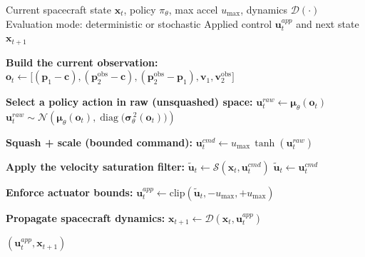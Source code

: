 \begin{algorithm}[H]
\caption{Policy Interface + Spacecraft Actuation: Policy Action $\rightarrow$ Applied Acceleration}
\label{alg:actuation_interface}
\begin{algorithmic}[1]
\Require Current spacecraft state $\mathbf{x}_t$, policy $\pi_\theta$, max accel $u_{\max}$, dynamics $\mathcal{D}(\cdot)$
\Require Evaluation mode: deterministic or stochastic
\Ensure Applied control $\mathbf{u}_t^{app}$ and next state $\mathbf{x}_{t+1}$

\State \textbf{Build the current observation:}
\State \hspace{1em} $\mathbf{o}_t \leftarrow \big[(\mathbf{p}_1-\mathbf{c}),(\mathbf{p}_2^{\mathrm{obs}}-\mathbf{c}),(\mathbf{p}_2^{\mathrm{obs}}-\mathbf{p}_1),\mathbf{v}_1,\mathbf{v}_2^{\mathrm{obs}}\big]$

\State \textbf{Select a policy action in raw (unsquashed) space:}
    \State \hspace{1em} $\mathbf{u}_t^{raw} \leftarrow \boldsymbol{\mu}_\theta(\mathbf{o}_t)$
\Else
    \State \hspace{1em} $\mathbf{u}_t^{raw} \sim \mathcal{N}\!\left(\boldsymbol{\mu}_\theta(\mathbf{o}_t), \operatorname{diag}\!\big(\boldsymbol{\sigma}_\theta^{\,2}(\mathbf{o}_t)\big)\right)$
\EndIf

\State \textbf{Squash + scale (bounded command):}
\State \hspace{1em} $\mathbf{u}_t^{cmd} \leftarrow u_{\max}\,\tanh\!\left(\mathbf{u}_t^{raw}\right)$

\State \textbf{Apply the velocity saturation filter:}
    \State \hspace{1em} $\tilde{\mathbf{u}}_t \leftarrow \mathcal{S}\!\left(\mathbf{x}_t,\mathbf{u}_t^{cmd}\right)$
\Else
    \State \hspace{1em} $\tilde{\mathbf{u}}_t \leftarrow \mathbf{u}_t^{cmd}$
\EndIf

\State \textbf{Enforce actuator bounds:}
\State \hspace{1em} $\mathbf{u}_t^{app} \leftarrow \mathrm{clip}\!\left(\tilde{\mathbf{u}}_t,-u_{\max},+u_{\max}\right)$

\State \textbf{Propagate spacecraft dynamics:}
\State \hspace{1em} $\mathbf{x}_{t+1} \leftarrow \mathcal{D}\!\left(\mathbf{x}_t,\mathbf{u}_t^{app}\right)$

\State \Return $(\mathbf{u}_t^{app}, \mathbf{x}_{t+1})$
\end{algorithmic}
\end{algorithm}




